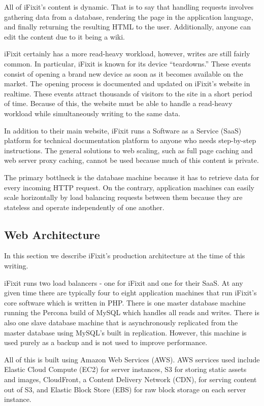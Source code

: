 \documentclass[12pt]{ucthesis}
\begin{document}
All of iFixit's content is dynamic.
That is to say that handling requests involves gathering data from a database, rendering the page in the application language, and finally returning the resulting HTML to the user.
Additionally, anyone can edit the content due to it being a wiki.

iFixit certainly has a more read-heavy workload, however, writes are still fairly common.
In particular, iFixit is known for its device ``teardowns.''
These events consist of opening a brand new device as soon as it becomes available on the market.
The opening process is documented and updated on iFixit's website in realtime.
These events attract thousands of visitors to the site in a short period of time.
Because of this, the website must be able to handle a read-heavy workload while simultaneously writing to the same data.

In addition to their main website, iFixit runs a Software as a Service (SaaS) platform for technical documentation platform to anyone who needs step-by-step instructions.
The general solutions to web scaling, such as full page caching and web server proxy caching, cannot be used because much of this content is private.

The primary bottlneck is the database machine because it has to retrieve data for every incoming HTTP request.
On the contrary, application machines can easily scale horizontally by load balancing requests between them because they are stateless and operate independently of one another.

\subsection{Web Architecture}
In this section we describe iFixit's production architecture at the time of this writing.

iFixit runs two load balancers - one for iFixit and one for their SaaS.
At any given time there are typically four to eight application machines that run iFixit's core software which is written in PHP.
There is one master database machine running the Percona build of MySQL which handles all reads and writes.
There is also one slave database machine that is asynchronously replicated from the master database using MySQL's built in replication.
However, this machine is used purely as a backup and is not used to improve performance.

All of this is built using Amazon Web Services (AWS).
AWS services used include Elastic Cloud Compute (EC2) for server instances, S3 for storing static assets and images, CloudFront, a Content Delivery Network (CDN), for serving content out of S3, and Elastic Block Store (EBS) for raw block storage on each server instance.
\end{document}
